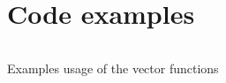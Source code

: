 
\section{Code examples}
\label{app:appA}
\begin{listing}[!ht]
\inputminted{fsharp}{Sections/Code/Vec2d.fsi}
\caption{Examples usage of the vector functions}
\label{app:vec_example}
\end{listing}
